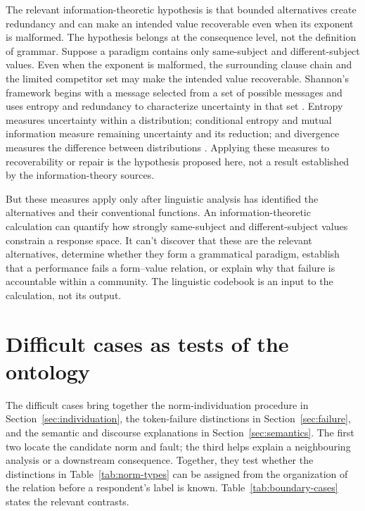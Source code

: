 \documentclass[12pt,letterpaper]{article}
\begin{document}
The relevant information-theoretic hypothesis is that bounded alternatives create
redundancy and can make an intended value recoverable even when its exponent is
malformed. The hypothesis belongs at the consequence level, not the definition of
grammar. Suppose a paradigm contains
only same-subject and different-subject values. Even when the exponent is
malformed, the surrounding clause chain and the limited competitor set may make
the intended value recoverable. Shannon's framework begins with a message selected
from a set of possible messages and uses entropy and redundancy to characterize
uncertainty in that set \citep[379, 392--399]{shannon1948}. Entropy measures
uncertainty within a distribution; conditional entropy and mutual information
measure remaining uncertainty and its reduction; and divergence measures the
difference between distributions \citep[13--22]{coverthomas2006}. Applying these
measures to recoverability or repair is the hypothesis proposed here, not a result
established by the information-theory sources.

But these measures apply only after linguistic analysis has identified the
alternatives and their conventional functions. An information-theoretic
calculation can quantify
how strongly same-subject and different-subject values constrain a response
space. It can't discover that these are the relevant alternatives, determine
whether they form a grammatical paradigm, establish that a performance fails a
form--value relation, or explain why that failure is accountable within a
community. The linguistic codebook is an input to the calculation, not its output.


\section{Difficult cases as tests of the ontology}
\label{sec:boundaries}

The difficult cases bring together the norm-individuation procedure in
Section~\ref{sec:individuation}, the token-failure distinctions in
Section~\ref{sec:failure}, and the semantic and discourse explanations in
Section~\ref{sec:semantics}. The first two locate the candidate norm and fault;
the third helps explain a neighbouring analysis or a downstream consequence.
Together, they test whether the distinctions in
Table~\ref{tab:norm-types} can be assigned from the organization of the relation
before a respondent's label is known. Table~\ref{tab:boundary-cases} states the
relevant contrasts.
\end{document}
